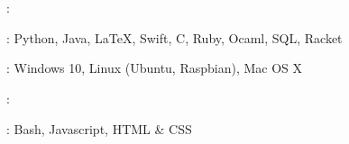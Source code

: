 \documentclass{resume}
\newif\ifen
\newif\ifzh
\newif\ifboth
\newcommand{\en}[1]{\ifen#1\fi}
\newcommand{\zh}[1]{\ifzh#1\fi}
\newcommand{\both}[1]{\ifboth#1\fi}
\begin{document}
    \section{\faCogs\ \en{Skills}\both{ }\zh{技能}}
    \begin{myitemize}
        \item \en{Languages}\both{ }\zh{语言}: \en{English - Proficient, Chinese - Native}
        \item \en{Programming Languages}\both{ }\zh{编程语言}: Python, Java, \LaTeX, Swift, C, Ruby, Ocaml, SQL, Racket
        \item \en{Platform}\both{ }\zh{平台}: Windows 10, Linux (Ubuntu, Raspbian), Mac OS X
        \item \en{Skills}\both{ }\zh{技术栈}: \en{Cryptography, Database Design, Data Visualization, Algorithm Design, Compiler, Computer Vision, iOS Programming, Network Security}
        \item \en{Others}\both{ }\zh{其他}: Bash, Javascript, HTML \& CSS
    \end{myitemize}


\end{document}
